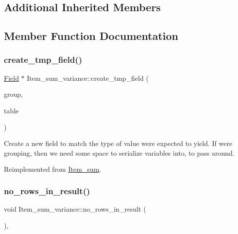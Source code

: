 \subsection*{Additional Inherited Members}


\subsection{Member Function Documentation}
\mbox{\label{classItem__sum__variance_a3e42297be638c4a648262165708e5440}} 
\subsubsection{\texorpdfstring{create\+\_\+tmp\+\_\+field()}{create\_tmp\_field()}}
{\footnotesize\ttfamily \mbox{\hyperlink{classField}{Field}} $\ast$ Item\+\_\+sum\+\_\+variance\+::create\+\_\+tmp\+\_\+field (\begin{DoxyParamCaption}\item[{bool}]{group,  }\item[{\mbox{\hyperlink{structTABLE}{T\+A\+B\+LE}} $\ast$}]{table }\end{DoxyParamCaption})\hspace{0.3cm}{\ttfamily [virtual]}}

Create a new field to match the type of value we\textquotesingle{}re expected to yield. If we\textquotesingle{}re grouping, then we need some space to serialize variables into, to pass around. 

Reimplemented from \mbox{\hyperlink{classItem__sum}{Item\+\_\+sum}}.

\mbox{\label{classItem__sum__variance_a510a0268827bac0bf1fc4cf933813745}} 
\subsubsection{\texorpdfstring{no\+\_\+rows\+\_\+in\+\_\+result()}{no\_rows\_in\_result()}}
{\footnotesize\ttfamily void Item\+\_\+sum\+\_\+variance\+::no\+\_\+rows\+\_\+in\+\_\+result (\begin{DoxyParamCaption}{ }\end{DoxyParamCaption})\hspace{0.3cm}{\ttfamily [inline]}, {\ttfamily [virtual]}}

